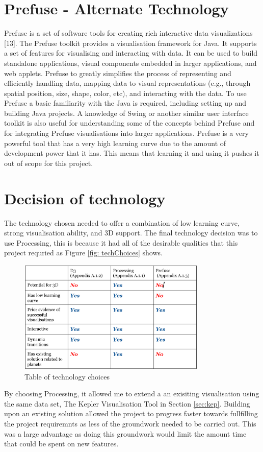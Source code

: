 \section{Prefuse - Alternate Technology}
Prefuse is a set of software tools for creating rich interactive data
visualizations [13]. The
Prefuse toolkit provides a visualisation framework for Java. It supports a set
of features
for visualising and interacting with data. It can be used to build standalone
applications, visual
components embedded
in larger applications, and web applets. Prefuse to greatly simplifies the
process
of representing and efficiently handling data, mapping data to visual
representations (e.g.,
through spatial position, size, shape, color, etc), and interacting with the
data.
To use Prefuse a basic familiarity with the Java is required, including setting
up and building
Java projects. A knowledge of Swing or another similar user interface toolkit is
also
useful for understanding some of the concepts behind Prefuse and for integrating
Prefuse
visualisations into larger applications. Prefuse is a very powerful tool that
has a very high learning curve due
to the amount of development power that it has. This means that learning it and
using it pushes it out of scope for this project.


\section{Decision of technology}

The technology chosen needed to offer a combination of low learning curve,
strong visualisation ability, and 3D support.
The final technology decision was to use Processing, this is because it had all
of the desirable qualities that this project requried as Figure \ref{fig:
techChoices} shows. 

\begin{figure}[H]
  \centering
      \includegraphics[width=0.8\textwidth]{images/table_technologies.jpg}
  \caption{Table of technology choices}
  \label{fig: techChoices}
\end{figure}

By choosing Processing, it allowed me to extend a an exisiting visualisation
using the same data set, The Kepler Visualisation Tool in Section \ref{sec:kep}.
Building upon an existing solution allowed the project to progress faster
towards fullfilling the project requiremnts as less of the groundwork needed to
be carried out. This was a large advantage as doing this groundwork would limit
the amount time that could be spent on new features.


